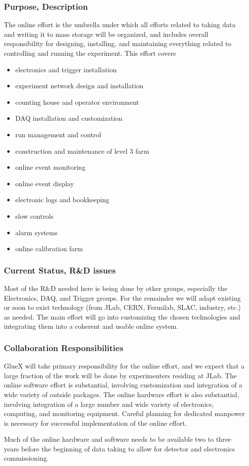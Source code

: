 \subsubsection*{Purpose, Description}

The online effort is the umbrella under which all efforts related to
taking data and writing it to mass storage will be organized, and
includes overall responsibility for designing, installing, and
maintaining everything related to controlling and running the
experiment.  This effort covers
\begin{itemize}
\item electronics and trigger installation
\item experiment network design and installation
\item counting house and operator environment
\item DAQ installation and customization
\item run management and control
\item construction and maintenance of level 3 farm
\item online event monitoring 
\item online event display
\item electronic logs and bookkeeping
\item slow controls
\item alarm systems
\item online calibration farm
\end{itemize}


\subsubsection*{Current Status, R\&D issues}

Most of the R\&D needed here is being done by other groups, especially
the Electronics, DAQ, and Trigger groups.  For the remainder we will
adapt existing or soon to exist technology (from JLab, CERN, Fermilab,
SLAC, industry, etc.) as needed.  The main effort will go into
customizing the chosen technologies and integrating them into a
coherent and usable online system.



\subsubsection*{Collaboration Responsibilities}

GlueX will take primary responsibility for the online effort, and we
expect that a large fraction of the work will be done by experimenters
residing at JLab.  The online software effort is substantial,
involving customization and integration of a wide variety of outside
packages.  The online hardware effort is also substantial, involving
integration of a large number and wide variety of electronics,
computing, and monitoring equipment.  Careful planning for dedicated
manpower is necessary for successful implementation of the online
effort.

Much of the online hardware and software needs to be available two to
three years before the beginning of data taking to allow for detector
and electronics commissioning.
